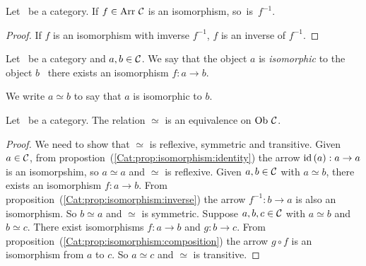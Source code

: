 \begin{prop}\label{Cat:prop:isomorphism:inverse}
    Let \Cat\ be a category. If $f\in\mbox{\rm Arr}\ \mbox{$\cal C$}$ is an isomorphism, so~is~$f^{-1}$.
\end{prop}
\begin{proof}
    If $f$ is an isomorphism with imverse $f^{-1}$, $f$ is an inverse of $f^{-1}$.
\end{proof}

\begin{defin}\label{Cat:def:isomorphic}
    Let \Cat\ be a category and $a,b\in\mbox{$\cal C$}$. We say that the object $a$ is 
    {\em isomorphic} to the object $b$ \ifand\ there exists an isomorphism
    $f:a\to b$.
\end{defin}

\begin{notation}\label{Cat:notation:isomorphic}
    We write $a\simeq b$ to say that $a$ is isomorphic to $b$.
\end{notation}

\begin{prop}\label{Cat:prop:isomorphic:equivalence}
    Let \Cat\ be a category. The relation $\simeq$ is an equivalence on 
    $\mbox{\rm Ob}\ \mbox{$\cal C$}$.
\end{prop}
\begin{proof}
    We need to show that $\simeq$ is reflexive, symmetric and transitive.
    Given $a\in\mbox{$\cal C$}$, from propostion~(\ref{Cat:prop:isomorphism:identity})
    the arrow $\mbox{\rm id}\,(a):a\to a$ is an isomorpshim, so $a\simeq a$ and $\simeq$ is 
    reflexive. Given $a,b\in\mbox{$\cal C$}$ with $a\simeq b$, there exists an isomorphism
    $f:a\to b$. From proposition~(\ref{Cat:prop:isomorphism:inverse}) the
    arrow $f^{-1}:b\to a$ is also an isomorphism. So $b\simeq a$ and $\simeq$
    is symmetric. Suppose $a,b,c\in\mbox{$\cal C$}$ with $a\simeq b$ and $b\simeq c$. 
    There exist isomorphisms $f:a\to b$ and $g:b\to c$. From
    proposition~(\ref{Cat:prop:isomorphism:composition}) the arrow $g\circ f$
    is an isomorphism from $a$ to $c$. So $a\simeq c$ and $\simeq$ is
    transitive.
\end{proof}


